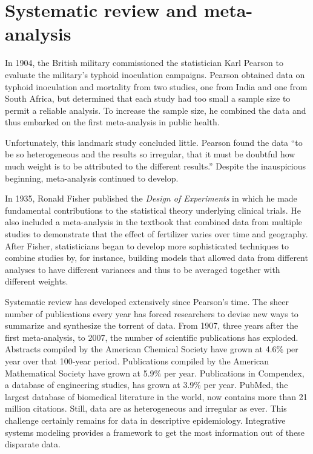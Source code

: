 \section{Systematic review and meta-analysis}
In 1904, the British military commissioned the statistician Karl
Pearson to evaluate
the military's typhoid inoculation
campaigns.\cite{Pearson_Report_1904} Pearson obtained data on typhoid
inoculation and mortality from two studies, one from India and one
from South Africa, but determined that each study had too small a
sample size to permit a reliable analysis. To increase the sample
size, he combined the data and thus embarked on the first
meta-analysis in public health.

Unfortunately, this landmark study concluded little. Pearson found the
data ``to be so heterogeneous and the results so irregular, that it
must be doubtful how much weight is to be attributed to the different
results.'' Despite the inauspicious beginning, meta-analysis continued
to develop.

In 1935, Ronald Fisher published the \emph{Design of
  Experiments} in which he made fundamental contributions to the
statistical theory underlying clinical trials. He also included a
meta-analysis in the textbook that combined data from multiple studies
to demonstrate that the effect of fertilizer varies over time and
geography. \cite{Fisher_Design_1935,O'Rourke_An_2007} After Fisher, statisticians began
to develop more sophisticated techniques to combine studies by, for
instance, building models that allowed data from different analyses to
have different variances and thus to be averaged together with
different weights.

Systematic review has developed extensively since Pearson's time. The
sheer number of publications every year has forced researchers to
devise new ways to summarize and synthesize the torrent of data. From
1907, three years after the first meta-analysis, to 2007, the number of
scientific publications has exploded. Abstracts compiled by the
American Chemical Society have grown at 4.6\% per year over that
100-year period. Publications compiled by the American Mathematical
Society have grown at 5.9\% per year.  Publications in Compendex, a
database of engineering studies, has grown at 3.9\% per year.
\cite{Larsen_Rate_2010} PubMed, the largest database of biomedical
literature in the world, now contains more than 21 million citations.
\cite{US_PubMed_2012} Still, data are as heterogeneous and irregular
as ever. This challenge certainly remains for data in descriptive
epidemiology. Integrative systems modeling provides a framework to get the most
information out of these disparate data.

